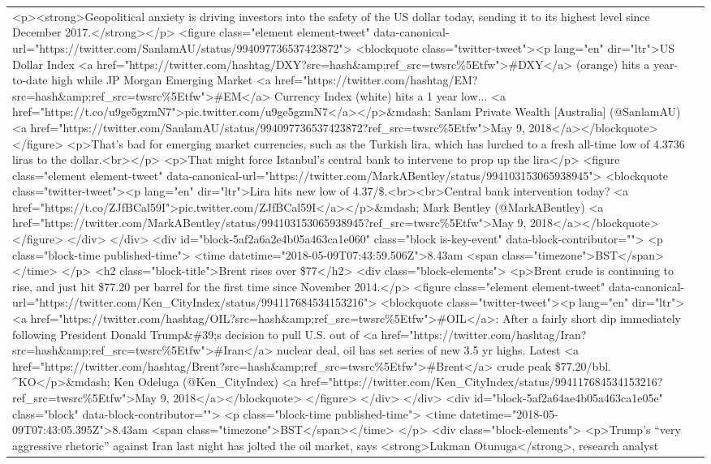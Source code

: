 \documentclass[]{article}
\begin{document}
\begin{table}[!h]
{\begin{tabular}[t]{ll}
<p><strong>Geopolitical anxiety is driving investors into the safety of the US dollar today, sending it to its highest level since December 2017.</strong></p>  <figure class="element element-tweet" data-canonical-url="https://twitter.com/SanlamAU/status/994097736537423872">  <blockquote class="twitter-tweet"><p lang="en" dir="ltr">US Dollar Index <a href="https://twitter.com/hashtag/DXY?src=hash\&amp;ref\_src=twsrc\%5Etfw">\#DXY</a> (orange) hits a year-to-date high while  JP Morgan Emerging Market <a href="https://twitter.com/hashtag/EM?src=hash\&amp;ref\_src=twsrc\%5Etfw">\#EM</a> Currency Index (white) hits a 1 year low... <a href="https://t.co/u9ge5gzmN7">pic.twitter.com/u9ge5gzmN7</a></p>\&mdash; Sanlam Private Wealth [Australia] (@SanlamAU) <a href="https://twitter.com/SanlamAU/status/994097736537423872?ref\_src=twsrc\%5Etfw">May 9, 2018</a></blockquote>  </figure>  <p>That’s bad for emerging market currencies, such as the Turkish lira, which has lurched to a fresh all-time low of 4.3736 liras to the dollar.<br></p> <p>That might force Istanbul’s central bank to intervene to prop up the lira</p>  <figure class="element element-tweet" data-canonical-url="https://twitter.com/MarkABentley/status/994103153065938945">  <blockquote class="twitter-tweet"><p lang="en" dir="ltr">Lira hits new low of 4.37/\$.<br><br>Central bank intervention today? <a href="https://t.co/ZJfBCal59I">pic.twitter.com/ZJfBCal59I</a></p>\&mdash; Mark Bentley (@MarkABentley) <a href="https://twitter.com/MarkABentley/status/994103153065938945?ref\_src=twsrc\%5Etfw">May 9, 2018</a></blockquote>  </figure> </div>   </div> <div id="block-5af2a6a2e4b05a463ca1e060" class="block is-key-event" data-block-contributor=""> <p class="block-time published-time"> <time datetime="2018-05-09T07:43:59.506Z">8.43am <span class="timezone">BST</span></time> </p>   <h2 class="block-title">Brent rises over \$77</h2>  <div class="block-elements">  <p>Brent crude is continuing to rise, and just hit \$77.20 per barrel for the first time since November 2014.</p>  <figure class="element element-tweet" data-canonical-url="https://twitter.com/Ken\_CityIndex/status/994117684534153216">  <blockquote class="twitter-tweet"><p lang="en" dir="ltr"><a href="https://twitter.com/hashtag/OIL?src=hash\&amp;ref\_src=twsrc\%5Etfw">\#OIL</a>: After a fairly short dip immediately following President Donald Trump\&\#39;s decision to pull U.S. out of <a href="https://twitter.com/hashtag/Iran?src=hash\&amp;ref\_src=twsrc\%5Etfw">\#Iran</a> nuclear deal, oil has set series of new 3.5 yr highs. Latest <a href="https://twitter.com/hashtag/Brent?src=hash\&amp;ref\_src=twsrc\%5Etfw">\#Brent</a> crude peak \$77.20/bbl. \textasciicircum{}KO</p>\&mdash; Ken Odeluga (@Ken\_CityIndex) <a href="https://twitter.com/Ken\_CityIndex/status/994117684534153216?ref\_src=twsrc\%5Etfw">May 9, 2018</a></blockquote>  </figure> </div>   </div> <div id="block-5af2a64ae4b05a463ca1e05e" class="block" data-block-contributor=""> <p class="block-time published-time"> <time datetime="2018-05-09T07:43:05.395Z">8.43am <span class="timezone">BST</span></time> </p>    <div class="block-elements">  <p>Trump’s “very aggressive rhetoric” against Iran last night has jolted the oil market, says <strong>Lukman Otunuga</strong>, research analyst 
\end{tabular}}
\end{table}
\end{document}
